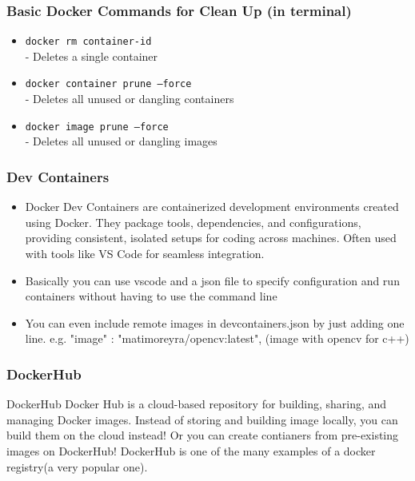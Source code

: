 \documentclass{beamer}
\begin{document}
\begin{frame}\frametitle{Basic Docker Commands for Clean Up (in terminal)}
\begin{itemize}
\item \texttt{docker rm container-id}\\- Deletes a single container
\item \texttt{docker container prune --force}\\- Deletes all unused or dangling containers
\item \texttt{docker image prune --force}\\- Deletes all unused or dangling images
\end{itemize}
\end{frame}


\begin{frame}\frametitle{Dev Containers}
\begin{itemize}
\item Docker Dev Containers are containerized development environments created 
using Docker. They package tools, dependencies, and configurations, providing
consistent, isolated setups for coding across machines. Often used with tools
like VS Code for seamless integration.
\item Basically you can use vscode and a json file to specify configuration and run containers 
without having to use the command line
\item You can even include remote images in devcontainers.json
by just adding one line. e.g. "image" : "matimoreyra/opencv:latest", (image with opencv for c++)
\end{itemize}
\end{frame}


\begin{frame}\frametitle{DockerHub}
\begin{block}{DockerHub}
Docker Hub is a cloud-based repository for building, sharing, and managing Docker images. 
Instead of storing and building image locally, you can build them on the cloud instead!
Or you can create contianers from pre-existing images on DockerHub! DockerHub is one of the 
many examples of a docker registry(a very popular one). 
\end{block}
\end{frame}
\end{document}
